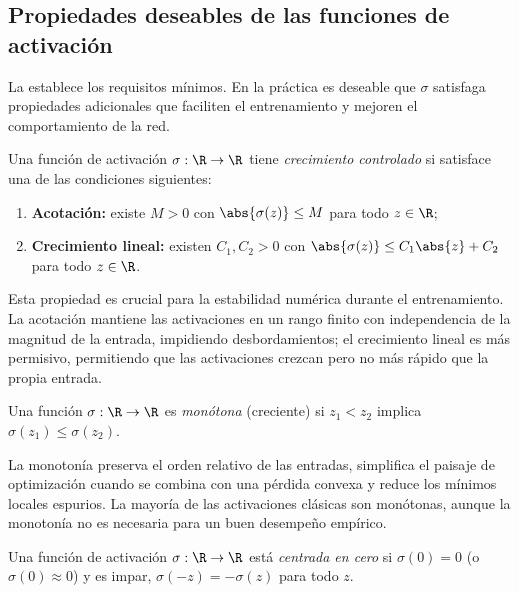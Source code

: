\subsection{Propiedades deseables de las funciones de activaci\'on}
\label{sec:found:activation-properties}

La  establece los requisitos m\'inimos. En la
pr\'actica es deseable que $\sigma$ satisfaga propiedades adicionales que faciliten
el entrenamiento y mejoren el comportamiento de la red.

\begin{definition}
\label{def:found:bounded}
Una funci\'on de activaci\'on $\sigma : \R \to \R$ tiene \emph{crecimiento
controlado} si satisface una de las condiciones siguientes:
\begin{enumerate}
  \item \textbf{Acotaci\'on:} existe $M > 0$ con $\abs{\sigma(z)} \le M$ para
    todo $z \in \R$;
  \item \textbf{Crecimiento lineal:} existen $C_1, C_2 > 0$ con
    $\abs{\sigma(z)} \le C_1\abs{z} + C_2$ para todo $z \in \R$.
\end{enumerate}
\end{definition}

Esta propiedad es crucial para la estabilidad num\'erica durante el entrenamiento.
La acotaci\'on mantiene las activaciones en un rango finito con independencia de la
magnitud de la entrada, impidiendo desbordamientos; el crecimiento lineal es m\'as
permisivo, permitiendo que las activaciones crezcan pero no m\'as r\'apido que la
propia entrada.

\begin{definition}[Monoton\'ia]
\label{def:found:monotone}
Una funci\'on $\sigma : \R \to \R$ es \emph{mon\'otona} (creciente) si $z_1 < z_2$
implica $\sigma(z_1) \le \sigma(z_2)$.
\end{definition}

La monoton\'ia preserva el orden relativo de las entradas, simplifica el paisaje
de optimizaci\'on cuando se combina con una p\'erdida convexa y reduce los m\'inimos
locales espurios. La mayor\'ia de las activaciones cl\'asicas son mon\'otonas,
aunque la monoton\'ia no es necesaria para un buen desempe\~no emp\'irico.

\begin{definition}
\label{def:found:zerocentered}
Una funci\'on de activaci\'on $\sigma : \R \to \R$ est\'a \emph{centrada en cero}
si $\sigma(0) = 0$ (o $\sigma(0) \approx 0$) y es impar,
$\sigma(-z) = -\sigma(z)$ para todo $z$.
\end{definition}

